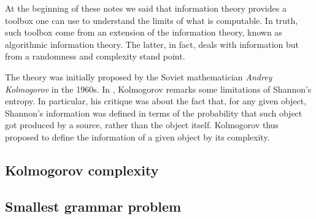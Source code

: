 \documentclass{subfiles}
\begin{document}
    At the beginning of these notes we said that information theory provides a
        toolbox one can use to understand the limits of what is computable.
        In truth, such toolbox come from an extension of the information theory,
        known as algorithmic information theory. The latter, in fact,
        deals with information but from a randomness and complexity stand point.

    The theory was initially proposed by the Soviet mathematician \emph{Andrey Kolmogorov} in the 1960s.
        In \cite{kolmogorov1965}, Kolmogorov remarks some limitations of Shannon's entropy.
        In particular, his critique was about the fact that, for any given object,
        Shannon's information was defined in terms of the probability that such object 
        got produced by a source, rather than the object itself.
        Kolmogorov thus proposed to define the information of a given object
        by its complexity.

        \subsection{Kolmogorov complexity}
        

        \subsection{Smallest grammar problem}
        
\end{document}
